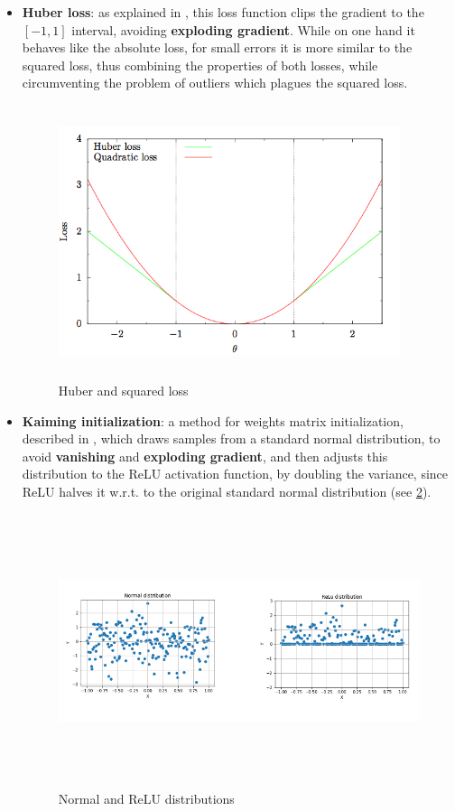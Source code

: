 \begin{itemize}
\item \textbf{Huber loss}: as explained in \cite{huber}, this loss function clips the gradient to the $[-1,1]$ interval, avoiding \textbf{exploding gradient}. While on one hand it behaves like the absolute loss, for small errors it is more similar to the squared loss, thus combining the properties of both losses, while circumventing the problem of outliers which plagues the squared loss.
\begin{figure}[H] 
\includegraphics[height=80mm, width=100mm, scale=0.5]{chapters/huber.png}
\centering
\caption{Huber and squared loss}
\label{fig:s2} 
\end{figure}
\item \textbf{Kaiming initialization}: a method for weights matrix initialization, described in \cite{kaiming}, which draws samples from a standard normal distribution, to avoid \textbf{vanishing} and \textbf{exploding gradient}, and then adjusts this distribution to the ReLU activation function, by doubling the variance, since ReLU halves it w.r.t. to the original standard normal distribution (see \ref{fig:s3}).
\begin{figure}[H] 
\includegraphics[height=80mm, width=140mm, scale=0.5]{chapters/relu_dist.png}
\centering
\caption{Normal and ReLU distributions}
\label{fig:s3} 
\end{figure}
\end{itemize}

